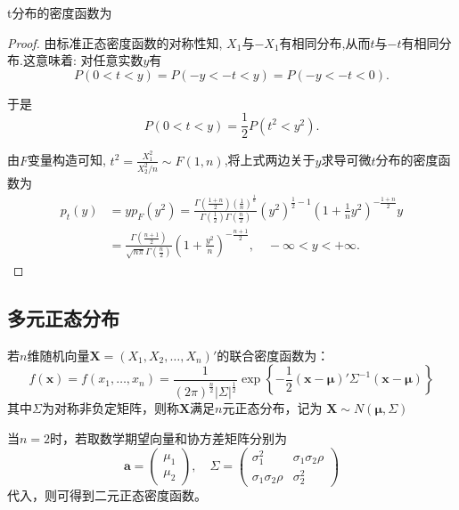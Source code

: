 \begin{proposition}
    t分布的密度函数为
\end{proposition}

\begin{proof}
    由标准正态密度函数的对称性知, $X_1$与$-X_1$有相同分布,从而$t$与$-t$有相同分布.这意味着: 对任意实数$y$有
    \[P(0<t<y)=P(-y<-t<y)=P(-y<-t<0).\]

    于是
    \[P(0<t<y)=\frac12P(t^2<y^2).\]

    由$F$变量构造可知, $t^2=\frac{X_1^2}{X_2^2/n}\sim F(1,n)$,将上式两边关于$y$求导可微$t$分布的密度函数为
    \begin{align*}
        p_t(y) & =yp_F(y^2)=\frac{\Gamma \left( \frac{1+n}{2} \right) \left( \frac{1}{n} \right) ^{\frac{1}{n}}}{\Gamma \left( \frac{1}{2} \right) \Gamma \left( \frac{n}{2} \right)}\left( y^2 \right) ^{\frac{1}{2}-1}\left( 1+\frac{1}{n}y^2 \right) ^{-\frac{1+n}{2}}y \\
               & =\frac{\Gamma \left( \frac{n+1}{2} \right)}{\sqrt{n\pi}\Gamma \left( \frac{n}{2} \right)}\left( 1+\frac{y^2}{n} \right) ^{-\frac{n+1}{2}},\quad -\infty<y<+\infty.
    \end{align*}
\end{proof}

\subsection{多元正态分布}

\begin{definition}
    若$n$维随机向量$\mathbf{X}=(X_1,X_2,\ldots,X_n)'$的联合密度函数为：
    \[ f(\mathbf{x})=f(x_1,\ldots,x_n)=\frac1{(2\pi)^{\frac{n}{2}} |\Sigma|^{\frac1{2}} }\exp\left\{ -\frac1{2}(\mathbf{x}-\mathbf{\mu})'\Sigma^{-1}(\mathbf{x}-\mathbf{\mu}) \right\} \]
    其中$\Sigma$为对称非负定矩阵，则称$\mathbf{X}$满足$n$元正态分布，记为 $\mathbf{X}\sim N(\mathbf{\mu},\Sigma)$
\end{definition}

当$n=2$时，若取数学期望向量和协方差矩阵分别为
	\begin{equation*}
		\mathbf{a}=\begin{pmatrix}
			\mu_1 \\
			\mu_2
		\end{pmatrix},\quad \Sigma=\begin{pmatrix}
			\sigma_1^2           & \sigma_1\sigma_2\rho \\
			\sigma_1\sigma_2\rho & \sigma_2^2
		\end{pmatrix}
	\end{equation*}
代入，则可得到二元正态密度函数。

